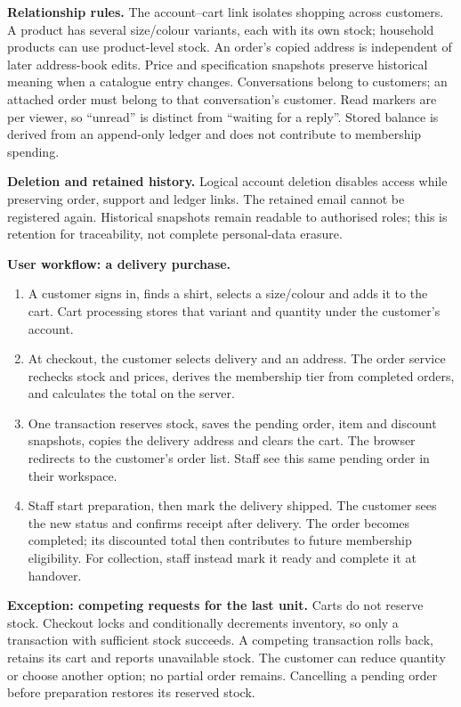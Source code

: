 \documentclass[11pt,a4paper]{article}
\begin{document}
\textbf{Relationship rules.} The account--cart link isolates shopping across customers. A product has several size/colour variants, each with its own stock; household products can use product-level stock. An order's copied address is independent of later address-book edits. Price and specification snapshots preserve historical meaning when a catalogue entry changes. Conversations belong to customers; an attached order must belong to that conversation's customer. Read markers are per viewer, so ``unread'' is distinct from ``waiting for a reply''. Stored balance is derived from an append-only ledger and does not contribute to membership spending.

\textbf{Deletion and retained history.} Logical account deletion disables access while preserving order, support and ledger links. The retained email cannot be registered again. Historical snapshots remain readable to authorised roles; this is retention for traceability, not complete personal-data erasure.

\newpage
\textbf{User workflow: a delivery purchase.}
\begin{enumerate}
\item A customer signs in, finds a shirt, selects a size/colour and adds it to the cart. Cart processing stores that variant and quantity under the customer's account.
\item At checkout, the customer selects delivery and an address. The order service rechecks stock and prices, derives the membership tier from completed orders, and calculates the total on the server.
\item One transaction reserves stock, saves the pending order, item and discount snapshots, copies the delivery address and clears the cart. The browser redirects to the customer's order list. Staff see this same pending order in their workspace.
\item Staff start preparation, then mark the delivery shipped. The customer sees the new status and confirms receipt after delivery. The order becomes completed; its discounted total then contributes to future membership eligibility. For collection, staff instead mark it ready and complete it at handover.
\end{enumerate}
\textbf{Exception: competing requests for the last unit.} Carts do not reserve stock. Checkout locks and conditionally decrements inventory, so only a transaction with sufficient stock succeeds. A competing transaction rolls back, retains its cart and reports unavailable stock. The customer can reduce quantity or choose another option; no partial order remains. Cancelling a pending order before preparation restores its reserved stock.
\end{document}
